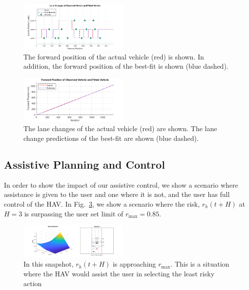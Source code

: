 \documentclass[letterpaper, 10 pt, conference]{ieeeconf}  %
\begin{document}
\begin{figure}[ht]
    \includegraphics[width=0.48\textwidth]{fig/fit2.png}
    \caption{The forward position of the actual vehicle (red) is shown. In addition, the forward position of the best-fit is shown (blue dashed).} \label{fig:fwd}
\end{figure}

\begin{figure}[ht]
    \includegraphics[width=0.48\textwidth]{fig/fitx.png}
    \caption{The lane changes of the actual vehicle (red) are shown. The lane change predictions of the best-fit are shown (blue dashed).} \label{fig:lanchan}
\end{figure}
 
 

 
\subsection{Assistive Planning and Control}
In order to show the impact of our assistive control, we show a scenario where assistance is given to the user and one where it is not, and the user has full control of the HAV. In Fig.~\ref{fig:critpt}, we show a scenario where the risk, $r_h(t+H)$ at $H=3$ is surpassing the user set limit of $r_{\max} = 0.85$.


\begin{figure}[ht] 
    \includegraphics[width=0.48\textwidth]{fig/critpt.png}
    \caption {In this snapshot, $r_h(t+H)$ is approaching $r_{\max}$. This is a situation where the HAV would assist the user in selecting the least risky action} \label{fig:critpt}
\end{figure}
\end{document}
